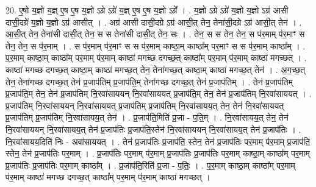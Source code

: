 \documentclass[17pt]{extarticle}
\begin{document}
20. ए॒षो य॒ज्ञो य॒ज्ञ् ए॒ष ए॒ष य॒ज्ञो ऽग्रे ऽग्रे॑ य॒ज्ञ् ए॒ष ए॒ष य॒ज्ञो ऽग्रे᳚ । . य॒ज्ञो ऽग्रे ऽग्रे॑ य॒ज्ञो य॒ज्ञो ऽग्र॑ आसी दासी॒दग्रे॑ य॒ज्ञो य॒ज्ञो ऽग्र॑ आसीत् । . अग्र॑ आसी दासी॒दग्रे ऽग्र॑ आसी॒त् तेन॒ तेना॑सी॒दग्रे ऽग्र॑ आसी॒त् तेन॑ । . आ॒सी॒त् तेन॒ तेना॑सी दासी॒त् तेन॒ स स तेना॑सी दासी॒त् तेन॒ सः । . तेन॒ स स तेन॒ तेन॒ स प॑र॒माम् प॑र॒माꣳ स तेन॒ तेन॒ स प॑र॒माम् । . स प॑र॒माम् प॑र॒माꣳ स स प॑र॒माम् काष्ठा॒म् काष्ठा᳚म् पर॒माꣳ स स प॑र॒माम् काष्ठा᳚म् । . प॒र॒माम् काष्ठा॒म् काष्ठा᳚म् पर॒माम् प॑र॒माम् काष्ठा॑ मगच्छ दगच्छ॒त् काष्ठा᳚म् पर॒माम् प॑र॒माम् काष्ठा॑ मगच्छत् । . काष्ठा॑ मगच्छ दगच्छ॒त् काष्ठा॒म् काष्ठा॑ मगच्छ॒त् तेन॒ तेना॑गच्छ॒त् काष्ठा॒म् काष्ठा॑ मगच्छ॒त् तेन॑ । . अ॒ग॒च्छ॒त् तेन॒ तेना॑गच्छ दगच्छ॒त् तेन॑ प्र॒जाप॑तिम् प्र॒जाप॑ति॒म् तेना॑गच्छ दगच्छ॒त् तेन॑ प्र॒जाप॑तिम् । . तेन॑ प्र॒जाप॑तिम् प्र॒जाप॑ति॒म् तेन॒ तेन॑ प्र॒जाप॑तिम् नि॒रवा॑साययन् नि॒रवा॑साययत् प्र॒जाप॑ति॒म् तेन॒ तेन॑ प्र॒जाप॑तिम् नि॒रवा॑साययत् । . प्र॒जाप॑तिम् नि॒रवा॑साययन् नि॒रवा॑साययत् प्र॒जाप॑तिम् प्र॒जाप॑तिम् नि॒रवा॑सायय॒त् तेन॒ तेन॑ नि॒रवा॑साययत् प्र॒जाप॑तिम् प्र॒जाप॑तिम् नि॒रवा॑सायय॒त् तेन॑ । . प्र॒जाप॑ति॒मिति॑ प्र॒जा - प॒ति॒म् । . नि॒रवा॑सायय॒त् तेन॒ तेन॑ नि॒रवा॑साययन् नि॒रवा॑सायय॒त् तेन॑ प्र॒जाप॑तिः प्र॒जाप॑ति॒स्तेन॑ नि॒रवा॑साययन् नि॒रवा॑सायय॒त् तेन॑ प्र॒जाप॑तिः । . नि॒रवा॑सायय॒दिति॑ निः - अवा॑साययत् । . तेन॑ प्र॒जाप॑तिः प्र॒जाप॑ति॒ स्तेन॒ तेन॑ प्र॒जाप॑तिः पर॒माम् प॑र॒माम् प्र॒जाप॑ति॒ स्तेन॒ तेन॑ प्र॒जाप॑तिः पर॒माम् । . प्र॒जाप॑तिः पर॒माम् प॑र॒माम् प्र॒जाप॑तिः प्र॒जाप॑तिः पर॒माम् काष्ठा॒म् काष्ठा᳚म् पर॒माम् प्र॒जाप॑तिः प्र॒जाप॑तिः पर॒माम् काष्ठा᳚म् । . प्र॒जाप॑ति॒रिति॑ प्र॒जा - प॒तिः॒ । . प॒र॒माम् काष्ठा॒म् काष्ठा᳚म् पर॒माम् प॑र॒माम् काष्ठा॑ मगच्छ दगच्छ॒त् काष्ठा᳚म् पर॒माम् प॑र॒माम् काष्ठा॑ मगच्छत् । \newline
\end{document}
